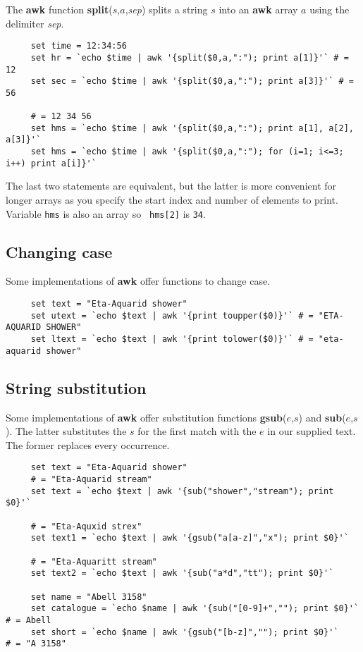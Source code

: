 The {\bf awk} function {\bf split}($s$,$a$,{\em sep}) splits a string
$s$ into an {\bf awk} array $a$ using the delimiter {\em sep}.

\small
\begin{verbatim}
     set time = 12:34:56
     set hr = `echo $time | awk '{split($0,a,":"); print a[1]}'` # = 12
     set sec = `echo $time | awk '{split($0,a,":"); print a[3]}'` # = 56

     # = 12 34 56
     set hms = `echo $time | awk '{split($0,a,":"); print a[1], a[2], a[3]}'`
     set hms = `echo $time | awk '{split($0,a,":"); for (i=1; i<=3; i++) print a[i]}'`
\end{verbatim}
\normalsize
The last two statements are equivalent, but the latter is more
convenient for longer arrays as you specify the start index and number
of elements to print.  Variable {\tt hms} is also an array so {\tt
hms[2]} is {\tt 34}.

\subsection{Changing case
\label{sc4_se_string_case}}

Some implementations of {\bf awk} offer functions to change case.

\small
\begin{verbatim}
     set text = "Eta-Aquarid shower"
     set utext = `echo $text | awk '{print toupper($0)}'` # = "ETA-AQUARID SHOWER"
     set ltext = `echo $text | awk '{print tolower($0)}'` # = "eta-aquarid shower"
\end{verbatim}
\normalsize


\subsection{String substitution
\label{sc4_se_string_sub}}

Some implementations of {\bf awk} offer substitution functions {\bf
gsub}($e$,$s$) and {\bf sub}($e$,$s$).  The latter substitutes the $s$
for the first match with the  $e$ in our supplied text.  The former
replaces every occurrence.

\small
\begin{verbatim}
     set text = "Eta-Aquarid shower"
     # = "Eta-Aquarid stream"
     set text = `echo $text | awk '{sub("shower","stream"); print $0}'` 
     
     # = "Eta-Aquxid strex"
     set text1 = `echo $text | awk '{gsub("a[a-z]","x"); print $0}'`

     # = "Eta-Aquaritt stream"
     set text2 = `echo $text | awk '{sub("a*d","tt"); print $0}'`

     set name = "Abell 3158"
     set catalogue = `echo $name | awk '{sub("[0-9]+",""); print $0}'`  # = Abell
     set short = `echo $name | awk '{gsub("[b-z]",""); print $0}'`      # = "A 3158"
\end{verbatim}
\normalsize

